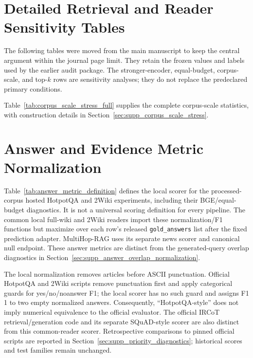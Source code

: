 \documentclass[pdflatex,sn-basic,Numbered]{sn-jnl}
\begin{document}


\FloatBarrier
\section{Detailed Retrieval and Reader Sensitivity Tables}
\label{sec:supp_detailed_sensitivity}

The following tables were moved from the main manuscript to keep the central argument within the journal page limit. They retain the frozen values and labels used by the earlier audit package. The stronger-encoder, equal-budget, corpus-scale, and top-$k$ rows are sensitivity analyses; they do not replace the predeclared primary conditions.




\FloatBarrier
Table~\ref{tab:corpus_scale_stress_full} supplies the complete corpus-scale statistics, with construction details in Section~\ref{sec:supp_corpus_scale_stress}.



\FloatBarrier
\section{Answer and Evidence Metric Normalization}
\label{sec:supp_metric_normalization}

Table~\ref{tab:answer_metric_definition} defines the local scorer for the processed-corpus hosted HotpotQA and 2Wiki experiments, including their BGE/equal-budget diagnostics. It is not a universal scoring definition for every pipeline. The common local full-wiki and 2Wiki readers import these normalization/F1 functions but maximize over each row's released \texttt{gold\_answers} list after the fixed prediction adapter. MultiHop-RAG uses its separate news scorer and canonical null endpoint. These answer metrics are distinct from the generated-query overlap diagnostics in Section~\ref{sec:supp_answer_overlap_normalization}.

The local normalization removes articles before ASCII punctuation. Official HotpotQA and 2Wiki scripts remove punctuation first and apply categorical guards for yes/no/noanswer F1; the local scorer has no such guard and assigns F1 1 to two empty normalized answers. Consequently, ``HotpotQA-style'' does not imply numerical equivalence to the official evaluator. The official IRCoT retrieval/generation code and its separate SQuAD-style scorer are also distinct from this common-reader scorer. Retrospective comparisons to pinned official scripts are reported in Section~\ref{sec:supp_priority_diagnostics}; historical scores and test families remain unchanged.
\end{document}
